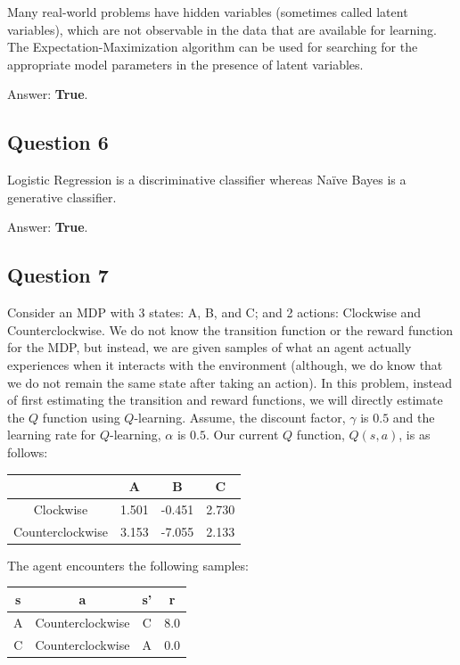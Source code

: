 \documentclass[11pt,fancychapters]{article}
\begin{document}
Many real-world problems have hidden variables (sometimes called latent variables), which are not observable in the data that are available for learning. The Expectation-Maximization algorithm can be used for searching for the appropriate model parameters in the presence of latent variables.

Answer: \textbf{True}.

\subsection*{Question 6 {\normalfont{[1 point]}}}

Logistic Regression is a discriminative classifier whereas Na\"{i}ve Bayes is a generative classifier.

Answer: \textbf{True}.

\subsection*{Question 7 {\normalfont{[12 points]}}}

Consider an MDP with 3 states: A, B, and C; and 2 actions: Clockwise and Counterclockwise. We do not know the transition function or the reward function for the MDP, but instead, we are given samples of what an agent actually experiences when it interacts with the environment (although, we do know that we do not remain the same state after taking an action). In this problem, instead of first estimating the transition and reward functions, we will directly estimate the $Q$ function using $Q$-learning. Assume, the discount factor, $\gamma$ is $0.5$ and the learning rate for $Q$-learning, $\alpha$ is $0.5$. Our current $Q$ function, $Q(s, a)$, is as follows:

\begin{table}[h!]
	\centering
	\begin{tabular}{| c | c | c | c |} 
		\hline
		& A & B & C \\
		\hline
		Clockwise & 1.501 & -0.451 & 2.730 \\
		\hline
		Counterclockwise & 3.153 & -7.055 & 2.133 \\
		\hline
	\end{tabular}
\end{table}

The agent encounters the following samples:

\begin{table}[h!]
	\centering
	\begin{tabular}{| c | c | c | c |} 
		\hline
		s & a & s' & r \\
		\hline
		A & Counterclockwise & C & 8.0 \\
		\hline
		C & Counterclockwise & A & 0.0 \\
		\hline
	\end{tabular}
\end{table}
\end{document}

